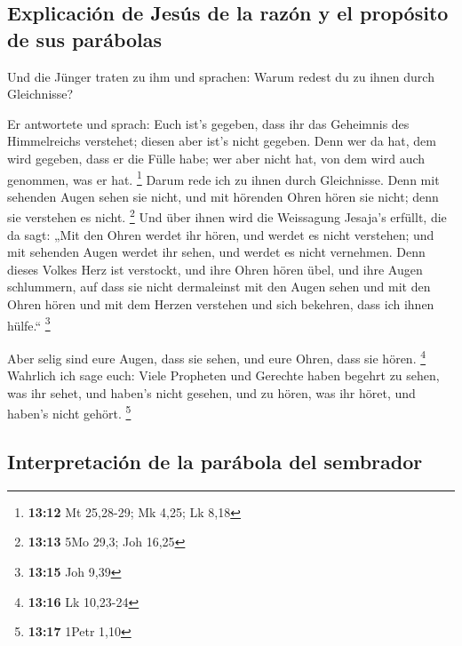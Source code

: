 \hypertarget{explicaciuxf3n-de-jesuxfas-de-la-razuxf3n-y-el-propuxf3sito-de-sus-paruxe1bolas}{%
\subsection{Explicación de Jesús de la razón y el propósito de sus
parábolas}\label{explicaciuxf3n-de-jesuxfas-de-la-razuxf3n-y-el-propuxf3sito-de-sus-paruxe1bolas}}

 Und die Jünger traten zu ihm und sprachen: Warum redest
du zu ihnen durch Gleichnisse?

 Er antwortete und sprach: Euch ist's gegeben, dass ihr
das Geheimnis des Himmelreichs verstehet; diesen aber ist's nicht
gegeben.  Denn wer da hat, dem wird gegeben, dass er die
Fülle habe; wer aber nicht hat, von dem wird auch genommen, was er hat.
\footnote{\textbf{13:12} Mt 25,28-29; Mk 4,25; Lk 8,18} 
Darum rede ich zu ihnen durch Gleichnisse. Denn mit sehenden Augen sehen
sie nicht, und mit hörenden Ohren hören sie nicht; denn sie verstehen es
nicht. \footnote{\textbf{13:13} 5Mo 29,3; Joh 16,25}  Und
über ihnen wird die Weissagung Jesaja's erfüllt, die da sagt: „Mit den
Ohren werdet ihr hören, und werdet es nicht verstehen; und mit sehenden
Augen werdet ihr sehen, und werdet es nicht vernehmen. 
Denn dieses Volkes Herz ist verstockt, und ihre Ohren hören übel, und
ihre Augen schlummern, auf dass sie nicht dermaleinst mit den Augen
sehen und mit den Ohren hören und mit dem Herzen verstehen und sich
bekehren, dass ich ihnen hülfe.`` \footnote{\textbf{13:15} Joh 9,39}

 Aber selig sind eure Augen, dass sie sehen, und eure
Ohren, dass sie hören. \footnote{\textbf{13:16} Lk 10,23-24}
 Wahrlich ich sage euch: Viele Propheten und Gerechte
haben begehrt zu sehen, was ihr sehet, und haben's nicht gesehen, und zu
hören, was ihr höret, und haben's nicht gehört. \footnote{\textbf{13:17}
  1Petr 1,10}

\hypertarget{interpretaciuxf3n-de-la-paruxe1bola-del-sembrador}{%
\subsection{Interpretación de la parábola del
sembrador}\label{interpretaciuxf3n-de-la-paruxe1bola-del-sembrador}}


